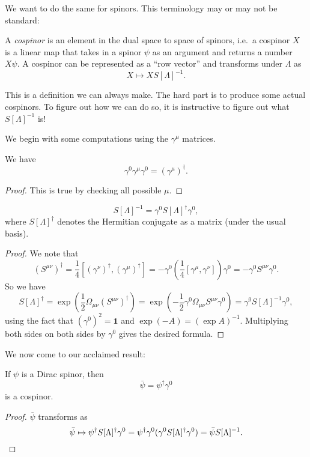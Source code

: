 \documentclass[a4paper]{article}
\begin{document}
We want to do the same for spinors. This terminology may or may not be standard:
\begin{defi}[Cospinor]
  A \emph{cospinor} is an element in the dual space to space of spinors, i.e.\ a cospinor $X$ is a linear map that takes in a spinor $\psi$ as an argument and returns a number $X\psi$. A cospinor can be represented as a ``row vector'' and transforms under $\Lambda$ as
  \[
    X \mapsto X S[\Lambda]^{-1}.
  \]
\end{defi}
This is a definition we can always make. The hard part is to produce some actual cospinors. To figure out how we can do so, it is instructive to figure out what $S[\Lambda]^{-1}$ is!

We begin with some computations using the $\gamma^\mu$ matrices.
\begin{prop}
  We have
  \[
    \gamma^0 \gamma^\mu \gamma^0 = (\gamma^\mu)^\dagger.
  \]
\end{prop}

\begin{proof}
  This is true by checking all possible $\mu$.
\end{proof}

\begin{prop}
  \[
    S[\Lambda]^{-1} = \gamma^0 S[\Lambda]^\dagger \gamma^0,
  \]
  where $S[\Lambda]^\dagger$ denotes the Hermitian conjugate as a matrix (under the usual basis).
\end{prop}

\begin{proof}
  We note that
  \[
    (S^{\mu\nu})^\dagger = \frac{1}{4}[(\gamma^\nu)^\dagger, (\gamma^\mu)^\dagger] = -\gamma^0 \left(\frac{1}{4}[\gamma^\mu, \gamma^\nu]\right) \gamma^0 = - \gamma^0 S^{\mu\nu} \gamma^0.
  \]
  So we have
  \[
    S[\Lambda]^\dagger = \exp\left(\frac{1}{2} \Omega_{\mu\nu}(S^{\mu\nu})^\dagger\right) = \exp\left(-\frac{1}{2} \gamma^0 \Omega_{\mu\nu}S^{\mu\nu}\gamma^0\right) = \gamma^0 S[\Lambda]^{-1} \gamma^0,
  \]
  using the fact that $(\gamma^0)^2 = \mathbf{1}$ and $\exp(-A) = (\exp A)^{-1}$. Multiplying both sides on both sides by $\gamma^0$ gives the desired formula.
\end{proof}

We now come to our acclaimed result:
\begin{prop}
  If $\psi$ is a Dirac spinor, then
  \[
    \bar\psi = \psi^\dagger \gamma^0
  \]
  is a cospinor.
\end{prop}

\begin{proof}
  $\bar \psi$ transforms as
  \[
    \bar \psi \mapsto \psi^\dagger S[\Lambda]^\dagger \gamma^0 = \psi^\dagger \gamma^0 (\gamma^0 S[\Lambda]^\dagger \gamma^0) = \bar\psi S[\Lambda]^{-1}. \qedhere
  \]
\end{proof}
\end{document}
